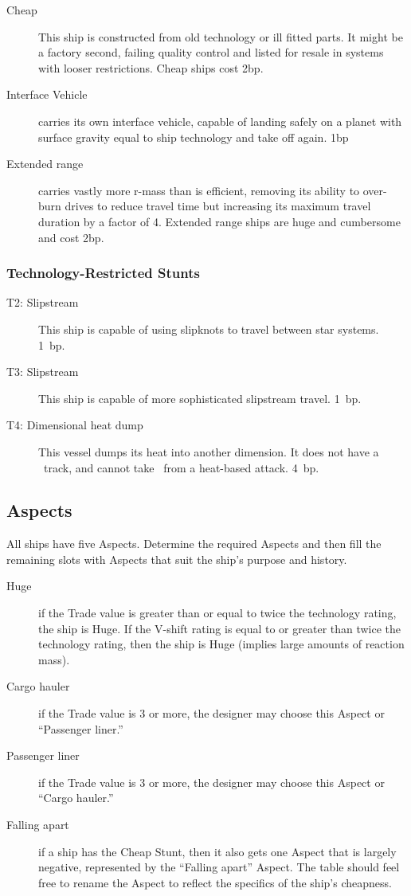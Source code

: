 \begin{description}
\item[Cheap]
This ship is constructed from old technology or ill fitted
parts. It might be a factory second, failing quality control and
listed for resale in systems with looser restrictions. Cheap ships
cost 2bp.
\item[Interface Vehicle]
carries its own interface vehicle, capable of landing safely on a planet with
surface gravity equal to ship technology and take off again. 1bp
\item[Extended range]
carries vastly more r-mass than is efficient, removing its ability to
over-burn drives to reduce travel time but increasing its maximum travel
duration by a factor of 4. Extended range ships are huge and cumbersome and
cost 2bp.
\end{description}

\subsubsection{Technology-Restricted Stunts}\label{sec:spacecraft-technology-restricted-stunts}
\begin{description}
\item[T2: Slipstream]
This ship is capable of using slipknots to travel between star systems. 1~bp.

\item[T3: Slipstream]
This ship is capable of more sophisticated slipstream travel. 1~bp.

\item[T4: Dimensional heat dump]
This vessel dumps its heat into another dimension. It does not have a \Heat\ track, and cannot take \Consequences\ from a heat-based attack. 4~bp.
\end{description}

\subsection{Aspects}\label{sec:spacecraft-aspects} %

All ships have five Aspects. Determine the required Aspects and then
fill the remaining slots with Aspects that suit the ship's purpose and
history.
\begin{description}
\item[Huge]
if the Trade value is greater than or equal to twice the technology rating,
the ship is Huge. If the V-shift rating is equal to or greater than twice the
technology rating, then the ship is Huge (implies large amounts of reaction
mass).
\item[Cargo hauler]
if the Trade value is 3 or more, the designer may choose this Aspect or
``Passenger liner.''
\item[Passenger liner]
if the Trade value is 3 or more, the designer may choose this Aspect or ``Cargo
hauler.''
\item[Falling apart]
if a ship has the Cheap Stunt, then it also gets one Aspect that is largely
negative, represented by the ``Falling apart'' Aspect. The table should feel free
to rename the Aspect to reflect the specifics of the ship's cheapness.
\end{description}

